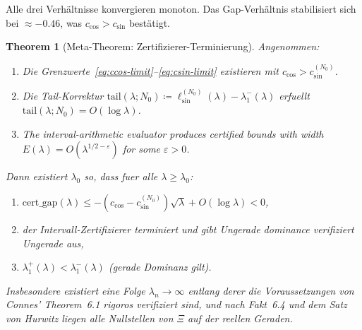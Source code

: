 \documentclass[12pt,a4paper]{article}
\newtheorem{theorem}{Theorem}[section]
\theoremstyle{definition}
\theoremstyle{remark}
\begin{document}
\noindent Alle drei Verhältnisse konvergieren monoton. Das Gap-Verhältnis stabilisiert sich bei $\approx -0.46$, was $c_{\cos} > c_{\sin}$ bestätigt.

\begin{theorem}[Meta-Theorem: Zertifizierer-Terminierung]
\label{thm:meta}
Angenommen:
\begin{enumerate}[label=\textup{(M\arabic*)}]
  \item\label{M1} Die Grenzwerte~\eqref{eq:ccos-limit}--\eqref{eq:csin-limit} existieren mit $c_{\cos} > c_{\sin}^{(N_0)}$.
  \item\label{M2} Die Tail-Korrektur $\mathrm{tail}(\lambda; N_0) \coloneqq \ell_{\sin}^{(N_0)}(\lambda) - \lambda_1^-(\lambda)$ erfuellt $\mathrm{tail}(\lambda; N_0) = O(\log\lambda)$.
  \item\label{M3} The interval-arithmetic evaluator produces certified bounds with width $E(\lambda) = O(\lambda^{1/2-\varepsilon})$ for some $\varepsilon > 0$.
\end{enumerate}
Dann existiert $\lambda_0$ so, dass fuer alle $\lambda \geq \lambda_0$:
\begin{enumerate}[label=\textup{(\roman*)}]
  \item $\mathrm{cert\_gap}(\lambda) \leq -(c_{\cos} - c_{\sin}^{(N_0)})\sqrt{\lambda} + O(\log\lambda) < 0$,
  \item der Intervall-Zertifizierer terminiert und gibt Ungerade dominance verifiziert Ungerade aus,
  \item $\lambda_1^+(\lambda) < \lambda_1^-(\lambda)$ (gerade Dominanz gilt).
\end{enumerate}
Insbesondere existiert eine Folge $\lambda_n \to \infty$ entlang derer die Voraussetzungen von Connes' Theorem~6.1 rigoros verifiziert sind, und nach Fakt~6.4 und dem Satz von Hurwitz liegen alle Nullstellen von $\Xi$ auf der reellen Geraden.
\end{theorem}
\end{document}
